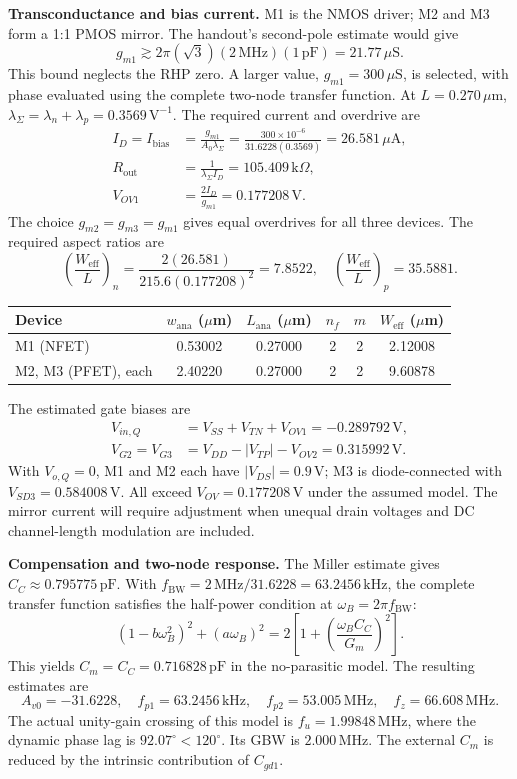 \documentclass[12pt,letterpaper]{article}
\newcommand{\um}{\,\mu\mathrm{m}}
\newcommand{\uA}{\,\mu\mathrm{A}}
\newcommand{\uS}{\,\mu\mathrm{S}}
\newcommand{\kohm}{\,\mathrm{k}\Omega}
\newcommand{\V}{\,\mathrm{V}}
\newcommand{\MHz}{\,\mathrm{MHz}}
\newcommand{\kHz}{\,\mathrm{kHz}}
\newcommand{\pF}{\,\mathrm{pF}}
\begin{document}
\begin{enumerate}
\textbf{Transconductance and bias current.}
M1 is the NMOS driver; M2 and M3 form a 1:1 PMOS mirror.
The handout's second-pole estimate would give
\[
g_{m1}\gtrsim 2\pi(\sqrt{3})(2\MHz)(1\pF)=21.77\uS.
\]
This bound neglects the RHP zero. A larger value,
$g_{m1}=300\uS$, is selected, with phase evaluated using
the complete two-node transfer function.
At $L=0.270\um$, $\lambda_\Sigma=\lambda_n+\lambda_p=0.3569\V^{-1}$.
The required current and overdrive are
\begin{align*}
I_D=I_{\mathrm{bias}}
&=\frac{g_{m1}}{A_0\lambda_\Sigma}
=\frac{300\times10^{-6}}{31.6228(0.3569)}
=26.581\uA,\\
R_{\mathrm{out}}&=\frac{1}{\lambda_\Sigma I_D}=105.409\kohm,\\
V_{OV1}&=\frac{2I_D}{g_{m1}}=0.177208\V.
\end{align*}
The choice $g_{m2}=g_{m3}=g_{m1}$ gives equal overdrives for all three devices.
The required aspect ratios are
\[
\left(\frac{W_{\mathrm{eff}}}{L}\right)_n
=\frac{2(26.581)}{215.6(0.177208)^2}=7.8522,
\quad
\left(\frac{W_{\mathrm{eff}}}{L}\right)_p=35.5881.
\]
\begin{center}
\small
\begin{tabular}{@{}lccccc@{}}
\toprule
Device & $w_{\mathrm{ana}}$ ($\mu$m) & $L_{\mathrm{ana}}$ ($\mu$m) & $n_f$ & $m$ & $W_{\mathrm{eff}}$ ($\mu$m)\\
\midrule
M1 (NFET) & 0.53002 & 0.27000 & 2 & 2 & 2.12008\\
M2, M3 (PFET), each & 2.40220 & 0.27000 & 2 & 2 & 9.60878\\
\bottomrule
\end{tabular}
\end{center}
The estimated gate biases are
\begin{align*}
V_{in,Q}&=V_{SS}+V_{TN}+V_{OV1}=-0.289792\V,\\
V_{G2}=V_{G3}&=V_{DD}-|V_{TP}|-V_{OV2}=0.315992\V.
\end{align*}
With $V_{o,Q}=0$, M1 and M2 each have $|V_{DS}|=0.9\V$;
M3 is diode-connected with $V_{SD3}=0.584008\V$.
All exceed $V_{OV}=0.177208\V$ under the assumed model.
The mirror current will require adjustment when unequal drain
voltages and DC channel-length modulation are included.

\textbf{Compensation and two-node response.}
The Miller estimate gives $C_C\approx0.795775\pF$.
With $f_{\mathrm{BW}}=2\MHz/31.6228=63.2456\kHz$,
the complete transfer function satisfies the half-power condition at
$\omega_B=2\pi f_{\mathrm{BW}}$:
\begin{equation}
(1-b\omega_B^2)^2+(a\omega_B)^2
=2\left[1+\left(\frac{\omega_B C_C}{G_m}\right)^2\right].
\label{eq:halfpower}
\end{equation}
This yields $C_m=C_C=0.716828\pF$ in the no-parasitic model.
The resulting estimates are
\[
A_{v0}=-31.6228,\quad f_{p1}=63.2456\kHz,\quad
f_{p2}=53.005\MHz,\quad f_z=66.608\MHz.
\]
The actual unity-gain crossing of this model is
$f_u=1.99848\MHz$, where the dynamic phase lag is
$92.07^\circ<120^\circ$. Its GBW is $2.000\MHz$.
The external $C_m$ is reduced by the intrinsic contribution of $C_{gd1}$.


\end{enumerate}
\end{document}
